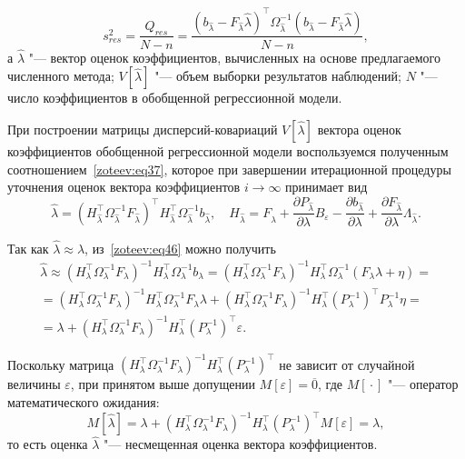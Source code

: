 \begin{equation}
s_{res}^2=\dfrac{Q_{res}}{N-n}=\dfrac{(b_{\hat{\lambda}}-F_{{\hat{\lambda}}}{\hat{\lambda}})^{\top}\Omega_{{\hat{\lambda}}}^{-1}
(b_{\hat{\lambda}}-F_{\hat{\lambda}}{\hat{\lambda}})}{N-n},
\label{zoteev:eq45}
\end{equation}
а ${\hat{\lambda}}$ "--- вектор оценок коэффициентов, вычисленных на основе предлагаемого численного метода; $V[{\hat{\lambda}}]$ "--- объем выборки результатов наблюдений; $N$  "--- число коэффициентов в обобщенной регрессионной модели.

При построении матрицы дисперсий-ковариаций $V[{\hat{\lambda}}]$ вектора оценок коэффициентов обобщенной регрессионной модели воспользуемся полученным соотношением~\eqref{zoteev:eq37}, которое при завершении итерационной процедуры уточнения оценок вектора коэффициентов $i \to \infty$ принимает вид
\begin{equation}
{\hat{\lambda}}=(H^{\top}_{{\hat{\lambda}}}\Omega_{{\hat{\lambda}}}^{-1}F_{{\hat{\lambda}}})^{\top}H^{\top}_{{\hat{\lambda}}}\Omega_{{\hat{\lambda}}}^{-1}b_{{\hat{\lambda}}}, \quad H_{{\hat{\lambda}}}=F_{{\hat{\lambda}}}+\dfrac{\partial P_{{\hat{\lambda}}}}{\partial \lambda}B_\varepsilon-\dfrac{\partial b_{{\hat{\lambda}}}}{\partial \lambda}+\dfrac{\partial F_{{\hat{\lambda}}}}{\partial \lambda}\Lambda_{{\hat{\lambda}}}.
\label{zoteev:eq46}
\end{equation}

Так как $\hat{\lambda} \approx \lambda$, из~\eqref{zoteev:eq46} можно получить
\begin{multline}
\hat{\lambda}\approx (H_\lambda^{\top}\Omega_\lambda^{-1}F_\lambda)^{-1}H_\lambda^{\top}\Omega_\lambda^{-1}b_\lambda=(H_\lambda^{\top}\Omega_\lambda^{-1}F_\lambda)^{-1}H_\lambda^{\top}\Omega_\lambda^{-1}(F_\lambda \lambda+\eta)=
\\
=(H_\lambda^{\top}\Omega_\lambda^{-1}F_\lambda)^{-1}H_\lambda^{\top}\Omega_\lambda^{-1}F_\lambda \lambda+(H_\lambda^{\top}\Omega_\lambda^{-1}F_\lambda)^{-1}H^{\top}_\lambda(P_\lambda^{-1})^{\top}P_\lambda^{-1}\eta=
\\
=\lambda+(H_\lambda^{\top}\Omega_\lambda^{-1}F_\lambda)^{-1}H_\lambda^{\top}(P_\lambda^{-1})^{\top}\varepsilon.
\end{multline}

Поскольку матрица $(H_\lambda^{\top}\Omega_\lambda^{-1}F_\lambda)^{-1}H_\lambda^{\top}(P_\lambda^{-1})^{\top}$  не зависит от случайной величины $\varepsilon$, при принятом выше допущении $M[\varepsilon]=\overline{0}$, где $M[{}\cdot{}]$ "--- оператор математического ожидания:
$$M[\hat{\lambda}]=\lambda+(H_\lambda^{\top}\Omega_\lambda^{-1}F_\lambda)^{-1}H_\lambda^{\top}(P_\lambda^{-1})^{\top}M[\varepsilon]=\lambda,$$ 
то есть оценка $\hat{\lambda}$  "--- несмещенная оценка вектора коэффициентов.


